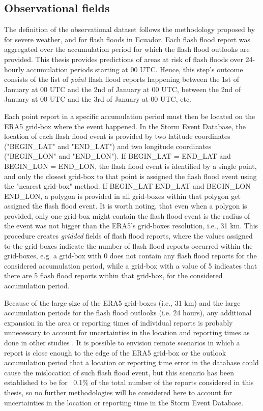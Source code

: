 \subsection{Observational fields}
\label{obs_field}
The definition of the observational dataset follows the methodology proposed by \citep{Tsonevsky_2018} for severe weather, and \citep{Pillosu_2024} for flash floods in Ecuador. Each flash flood report was aggregated over the accumulation period for which the flash flood outlooks are provided. This thesis provides predictions of areas at risk of flash floods over 24-hourly accumulation periods starting at 00 UTC. Hence, this step's outcome consists of the list of \textit{point} flash flood reports happening between the 1st of January at 00 UTC and the 2nd of January at 00 UTC, between the 2nd of January at 00 UTC and the 3rd of January at 00 UTC, etc. 

Each point report in a specific accumulation period must then be located on the ERA5 grid-box where the event happened. In the Storm Event Database, the location of each flash flood event is provided by two latitude coordinates ("BEGIN\_LAT" and "END\_LAT") and two longitude coordinates ("BEGIN\_LON" and "END\_LON"). If BEGIN\_LAT = END\_LAT and BEGIN\_LON = END\_LON, the flash flood event is identified by a single point, and only the closest grid-box to that point is assigned the flash flood event using the "nearest grid-box" method. If BEGIN\_LAT \ne END\_LAT and BEGIN\_LON \ne END\_LON, a polygon is provided in all grid-boxes within that polygon get assigned the flash flood event. It is worth noting, that even when a polygon is provided, only one grid-box might contain the flash flood event is the radius of the event was not bigger than the ERA5's grid-boxes resolution, i.e., 31 km. This procedure creates \textit{gridded} fields of flash flood reports, where the values assigned to the grid-boxes indicate the number of flash flood reports occurred within the grid-boxes, e.g. a grid-box with 0 does not contain any flash flood reports for the considered accumulation period, while a grid-box with a value of 5 indicates that there are 5 flash flood reports within that grid-box, for the considered accumulation period.

Because of the large size of the ERA5 grid-boxes (i.e., 31 km) and the large accumulation periods for the flash flood outlooks (i.e. 24 hours), any additional expansion in the area or reporting times of individual reports is probably unnecessary to account for uncertainties in the location and reporting times as done in other studies \citep{Cavaiola_2024}. It is possible to envision remote scenarios in which a report is close enough to the edge of the ERA5 grid-box or the outlook accumulation period that a location or reporting time error in the database could cause the mislocation of such flash flood event, but this scenario has been established to be for ~0.1\% of the total number of the reports considered in this thesis, so no further methodologies will be considered here to account for uncertainties in the location or reporting time in the Storm Event Database. 


